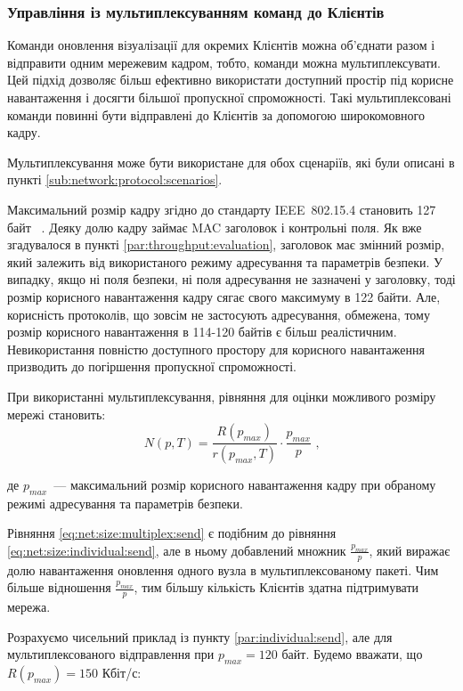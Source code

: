 \documentclass[a4paper,ukrainian,utf8,nocolumnsxix,floatsection,equationsection]{eskdtext}
\renewcommand\paragraph{\subsubsection}
\newcommand{\iee}[0]{IEEE~802.15.4\xspace}
\begin{document}
\paragraph{Управління із мультиплексуванням команд до Клієнтів}

Команди оновлення візуалізації для окремих Клієнтів можна об'єднати разом і відправити одним мережевим кадром, тобто, команди можна мультиплексувати. Цей підхід дозволяє більш ефективно використати доступний простір під корисне навантаження і досягти більшої пропускної спроможності. Такі мультиплексовані команди повинні бути відправлені до Клієнтів за допомогою широкомовного кадру.

Мультиплексування може бути використане для обох сценаріїв, які були описані в пункті \ref{sub:network:protocol:scenarios}.

Максимальний розмір кадру згідно до стандарту \iee становить 127 байт ~\cite{ieee:802:15:4:2011}. Деяку долю кадру займає MAC заголовок і контрольні поля. Як вже згадувалося в пункті \ref{par:throughput:evaluation}, заголовок має змінний розмір, який залежить від використаного режиму адресування та параметрів безпеки. У випадку, якщо ні поля безпеки, ні поля адресування не зазначені у заголовку, тоді розмір корисного навантаження кадру сягає свого максимуму в 122 байти. Але, корисність протоколів, що зовсім не застосують адресування, обмежена, тому розмір корисного навантаження в 114-120 байтів є більш реалістичним. Невикористання повністю доступного простору для корисного навантаження призводить до погіршення пропускної спроможності.

При використанні мультиплексування, рівняння для оцінки можливого розміру мережі становить:
\begin{equation}\label{eq:net:size:multiplex:send}
	N(p, T) = \frac{R(p_{max})}{r(p_{max}, T)} \cdot \frac{p_{max}}{p} \text{ ,}
\end{equation}

де $p_{max}$~--- максимальний розмір корисного навантаження кадру при обраному режимі адресування та параметрів безпеки.

Рівняння \ref{eq:net:size:multiplex:send} є подібним до рівняння \ref{eq:net:size:individual:send}, але в ньому добавлений множник $\frac{p_{max}}{p}$, який виражає долю навантаження оновлення одного вузла в мультиплексованому пакеті. Чим більше відношення $\frac{p_{max}}{p}$, тим більшу кількість Клієнтів здатна підтримувати мережа.

Розрахуємо чисельний приклад із пункту \ref{par:individual:send}, але для мультиплексованого відправлення при $p_{max} = 120$ байт. Будемо вважати, що $R(p_{max}) = 150$ Кбіт/с:
\end{document}
